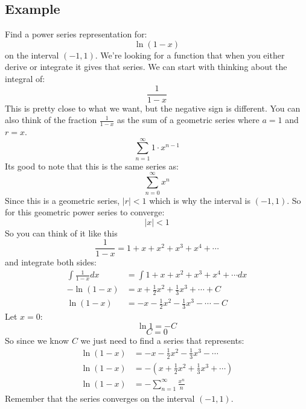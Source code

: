 \documentclass{report}
\begin{document}
    \subsection{Example}
        Find a power series representation for:
        \[\ln (1-x)\]
        on the interval \((-1, 1)\).
        We're looking for a function that when you either derive or integrate it gives that series.
        We can start with thinking about the integral of:
        \[\frac{1}{1-x}\]
        This is pretty close to what we want, but the negative sign is different.
        You can also think of the fraction \(\frac{1}{1-x}\) as the sum of a geometric series where \(a = 1\) and \(r = x\).
        \[\sum_{n = 1}^{\infty} 1 \cdot x^{n-1} \]
        Its good to note that this is the same series as:
        \[\sum_{n=0}^{\infty} x^n\]
        Since this is a geometric series, \(|r| < 1\) which is why the interval is \((-1, 1)\).
        So for this geometric power series to converge:
        \[|x| < 1\]
        So you can think of it like this
        \[\frac{1}{1-x} = 1 + x + x^2 + x^3 + x^4 + \cdots\]
        and integrate both sides:
        \begin{align*}
            \int \frac{1}{1-x} dx &= \int 1 + x + x^2 + x^3 + x^4 + \cdots dx \\
            - \ln (1-x) &= x + \frac{1}{2}x^2 + \frac{1}{3}x^3 + \cdots + C \\
            \ln (1-x) &= -x - \frac{1}{2}x^2 - \frac{1}{3}x^3 - \cdots - C 
        \end{align*}
        Let \(x = 0\):
        \[\ln 1 = -C\]
        \[C = 0\]
        So since we know \(C\) we just need to find a series that represents:
        \begin{align*}
            \ln (1-x) &= -x - \frac{1}{2}x^2 - \frac{1}{3}x^3 - \cdots \\
            \ln (1-x) &= -(x + \frac{1}{2}x^2 + \frac{1}{3}x^3 + \cdots) \\
            \ln (1-x) &= - \sum_{n = 1}^{\infty} \frac{x^n}{n}
        \end{align*}
        Remember that the series converges on the interval \((-1, 1)\).

\newpage
\end{document}
